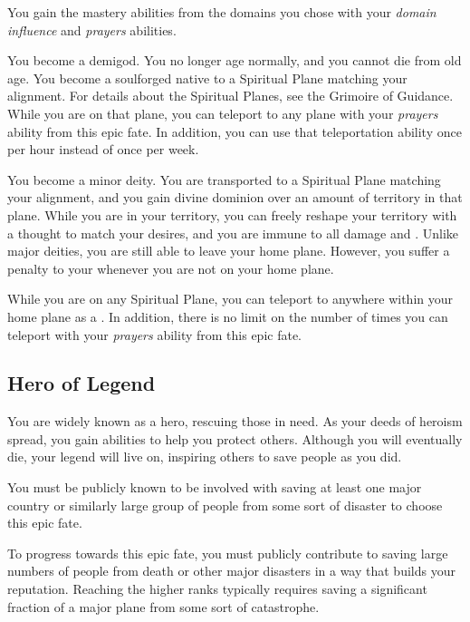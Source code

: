        You gain the mastery abilities from the domains you chose with your \textit{domain influence} and \textit{prayers} abilities.

       You become a demigod.
      You no longer age normally, and you cannot die from old age.
      You become a soulforged native to a Spiritual Plane matching your alignment.
      For details about the Spiritual Planes, see the Grimoire of Guidance.
      While you are on that plane, you can teleport to any plane with your \textit{prayers} ability from this epic fate.
      In addition, you can use that teleportation ability once per hour instead of once per week.

       You become a minor deity.
      You are transported to a Spiritual Plane matching your alignment, and you gain divine dominion over an amount of territory in that plane.
      While you are in your territory, you can freely reshape your territory with a thought to match your desires, and you are immune to all damage and .
      Unlike major deities, you are still able to leave your home plane.
      However, you suffer a  penalty to your  whenever you are not on your home plane.

      While you are on any Spiritual Plane, you can teleport to anywhere within your home plane as a .
      In addition, there is no limit on the number of times you can teleport with your \textit{prayers} ability from this epic fate.

  \subsection{Hero of Legend}
    You are widely known as a hero, rescuing those in need.
    As your deeds of heroism spread, you gain abilities to help you protect others.
    Although you will eventually die, your legend will live on, inspiring others to save people as you did.

     You must be publicly known to be involved with saving at least one major country or similarly large group of people from some sort of disaster to choose this epic fate.

     To progress towards this epic fate, you must publicly contribute to saving large numbers of people from death or other major disasters in a way that builds your reputation.
    Reaching the higher ranks typically requires saving a significant fraction of a major plane from some sort of catastrophe.

